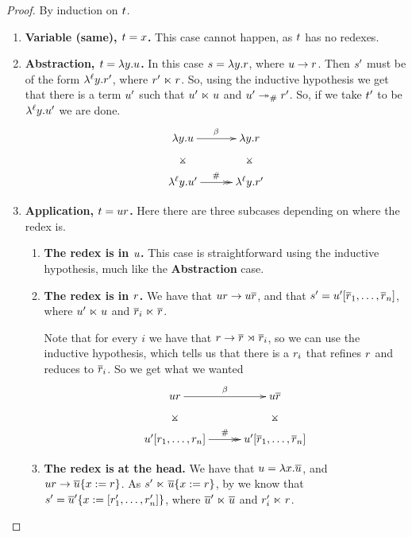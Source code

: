 \begin{proof}
By induction on $t$.
\begin{enumerate}
\item {\bf Variable (same), $t = x$.} This case cannot happen, as $t$ has no redexes.
\item {\bf Abstraction, $t = \lambda y. u$.}
  In this case $s = \lambda y. r$, where $u \to r$.
  Then $s'$ must be of the form $\lambda^{\ell} y. r'$, where $r' \mathrel{\ltimes} r$.
  So, using the inductive hypothesis we get that there is a term $u'$
    such that $u' \mathrel{\ltimes} u$ and $u' \mathrel{\twoheadrightarrow}_{\mathtt{\#}} r'$.
  So, if we take $t'$ to be $\lambda^{\ell} y. u'$ we are done.
  \[
  \xymatrix@C=1cm{
    \lam{\vartwo}{\tmthree} \ar@{}[d]|*=0[@]{\rtimes} \ar[r]^{\beta} & \lam{\vartwo}{\tmfour} \ar@{}[d]|*=0[@]{\rtimes} \\
    \lamp{\lab}{\vartwo}{\tmthree'} \ar@{->>}[r]^{\dist} & \lamp{\lab}{\vartwo}{\tmfour'} \\
  }
  \]

\item {\bf Application, $t = u r$.}
  Here there are three subcases depending on where the redex is.
  \begin{enumerate}
    \item {\bf The redex is in $u$.} This case is straightforward using the inductive hypothesis, much like the {\bf Abstraction} case.
    \item {\bf The redex is in $r$.}
      We have that $u r \to u \overline{r}$,
      and that $s' = u' [\overline{r}_1, \hdots, \overline{r}_n]$,
      where $u' \mathrel{\ltimes} u$ and $\overline{r}_i \mathrel{\ltimes} \overline{r}$.

      Note that for every $i$ we have that $r \to \overline{r} \mathrel{\rtimes} \overline{r}_i$,
      so we can use the inductive hypothesis, which tells us that there is a $r_i$ that refines $r$
      and reduces to $\overline{r}_i$.
      So we get what we wanted
      \[
      \xymatrix@C=1cm{
        \tmthree \tmfour \ar@{}[d]|*=0[@]{\rtimes} \ar[r]^{\beta} & \tmthree \overline{\tmfour} \ar@{}[d]|*=0[@]{\rtimes} \\
        \tmthree'[\tmfour_1, \hdots, \tmfour_n] \ar@{->>}[r]^{\dist} & \tmthree'[\overline{\tmfour}_1, \hdots, \overline{\tmfour}_n] \\
      }
      \]
    \item {\bf The redex is at the head.}
      We have that $u = \lambda x. \overline{u}$, and
        $u r \to \overline{u}\{x := r\}$.
        As $s' \mathrel{\ltimes} \overline{u}\{x := r\}$,
        by  we know that
        $s' = \overline{u}'\{x := [r'_1, \hdots, r'_n]\}$,
        where $\overline{u}' \mathrel{\ltimes} \overline{u}$ and $r'_i \mathrel{\ltimes} r$.


\end{enumerate}
\end{enumerate}
\end{proof}
